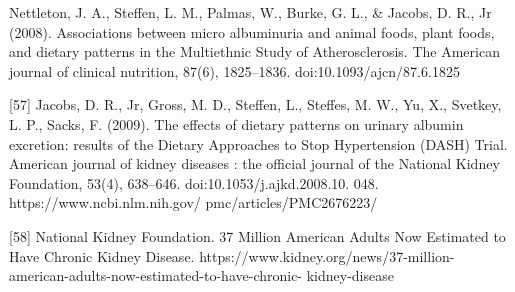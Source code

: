 \begin{flushleft}
[56]  Nettleton, J. A., Steffen, L. M., Palmas, W., Burke, G. L., \& Jacobs, D. R., Jr (2008). Associations between micro albuminuria and animal foods, plant foods, and dietary patterns in the 
Multiethnic Study of Atherosclerosis. The American journal of clinical nutrition, 87(6), 1825–1836. doi:10.1093/ajcn/87.6.1825

[57] 	Jacobs, D. R., Jr, Gross, M. D., Steffen, L., Steffes, M. W., Yu, X., Svetkey, L. P.,  Sacks, F. (2009). 
The effects of dietary patterns on urinary albumin excretion: results of the Dietary Approaches to Stop
Hypertension (DASH) Trial. American journal of kidney diseases : the official journal of the National 
Kidney Foundation, 53(4), 638–646. doi:10.1053/j.ajkd.2008.10. 048. https://www.ncbi.nlm.nih.gov/
pmc/articles/PMC2676223/

[58] National Kidney Foundation. 37 Million American Adults Now Estimated to Have Chronic Kidney 
Disease. https://www.kidney.org/news/37-million-american-adults-now-estimated-to-have-chronic- 
kidney-disease

\end{flushleft}
